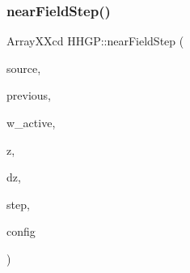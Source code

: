 \mbox{\label{namespace_h_h_g_p_ac1baa8acdff84a0c6de695d1d148b778}} 
\subsubsection{\texorpdfstring{near\+Field\+Step()}{nearFieldStep()}\hspace{0.1cm}{\footnotesize\ttfamily [2/2]}}
{\footnotesize\ttfamily Array\+X\+Xcd H\+H\+G\+P\+::near\+Field\+Step (\begin{DoxyParamCaption}\item[{Array\+X\+Xcd}]{source,  }\item[{Array\+X\+Xcd}]{previous,  }\item[{Array\+Xd}]{w\+\_\+active,  }\item[{double}]{z,  }\item[{double}]{dz,  }\item[{int}]{step,  }\item[{\hyperlink{class_config___settings}{Config\+\_\+\+Settings}}]{config }\end{DoxyParamCaption})}

